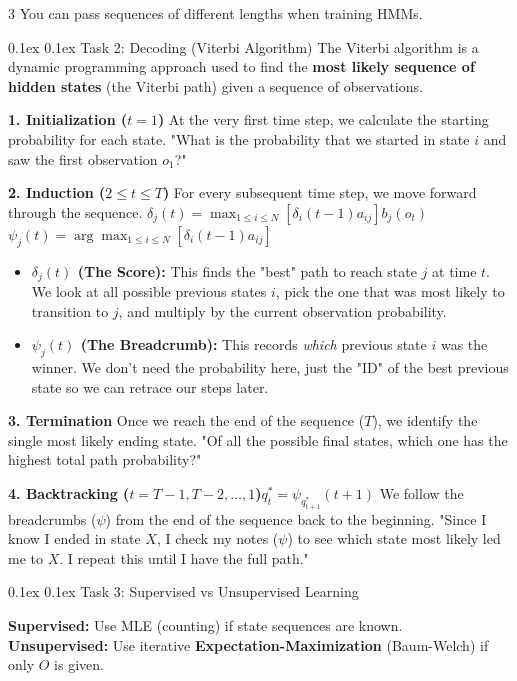 \documentclass[8pt,landscape]{article}
\makeatletter
\renewcommand{\section}{\@startsection{section}{2}{0pt}%
{0.1ex}%
{0.1ex}%
{\fontsize{8}{9}\bfseries\color{red}}}
\newcommand{\smalltext}[1]{
{\fontsize{8}{9}\selectfont\sloppy #1\par}
}
\makeatother
\begin{document}
\begin{multicols}{3}
{You can pass sequences of different lengths when training HMMs.
}

\section{Task 2: Decoding (Viterbi Algorithm)}
The Viterbi algorithm is a dynamic programming approach used to find the \textbf{most likely sequence of hidden states} (the Viterbi path) given a sequence of observations.

\textbf{1. Initialization ($t=1$)}
At the very first time step, we calculate the starting probability for each state.
"What is the probability that we started in state $i$ and saw the first observation $o_1$?"

\textbf{2. Induction ($2 \le t \le T$)}
For every subsequent time step, we move forward through the sequence.
$    \delta_j(t) = \max_{1 \le i \le N} \left[ \delta_i(t-1) a_{ij} \right] b_j(o_t)$
$
  \psi_j(t) = \arg\max_{1 \le i \le N} \left[ \delta_i(t-1) a_{ij} \right]
$  
\begin{itemize}
    \item \textbf{$\delta_j(t)$ (The Score):} This finds the "best" path to reach state $j$ at time $t$. We look at all possible previous states $i$, pick the one that was most likely to transition to $j$, and multiply by the current observation probability.
    \item \textbf{$\psi_j(t)$ (The Breadcrumb):} This records \textit{which} previous state $i$ was the winner. We don't need the probability here, just the "ID" of the best previous state so we can retrace our steps later.
\end{itemize}

\textbf{3. Termination}
Once we reach the end of the sequence ($T$), we identify the single most likely ending state.
"Of all the possible final states, which one has the highest total path probability?"

\textbf{4. Backtracking ($t = T-1, T-2, \dots, 1$)$ q^*_t = \psi_{q^*_{t+1}}(t+1)$}
We follow the breadcrumbs ($\psi$) from the end of the sequence back to the beginning.
"Since I know I ended in state $X$, I check my notes ($\psi$) to see which state most likely led me to $X$. I repeat this until I have the full path."

\section{Task 3: Supervised vs Unsupervised Learning}
\smalltext{
\textbf{Supervised:} Use MLE (counting) if state sequences are known. \\
\textbf{Unsupervised:} Use iterative \textbf{Expectation-Maximization} (Baum-Welch) if only $O$ is given.
}


\end{multicols}
\end{document}
